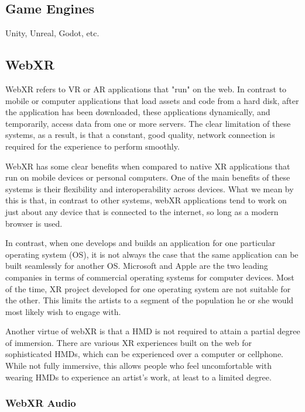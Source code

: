 

\subsection{Game Engines}
Unity, Unreal, Godot, etc.

\subsection{WebXR}

WebXR refers to VR or AR applications that "run" on the web. In contrast to mobile or computer applications that load assets and code from a hard disk, after the application has been downloaded, these applications dynamically, and temporarily, access data from one or more servers. The clear limitation of these systems, as a result, is that a constant, good quality, network connection is required for the experience to perform smoothly. 

WebXR has some clear benefits when compared to native XR applications that run on mobile devices or personal computers. One of the main benefits of these systems is their flexibility and interoperability across devices. What we mean by this is that, in contrast to other systems, webXR applications tend to work on just about any device that is connected to the internet, so long as a modern browser is used. 

In contrast, when one develops and builds an application for one particular operating system (OS), it is not always the case that the same application can be built seamlessly for another OS. Microsoft and Apple are the two leading companies in terms of commercial operating systems for computer devices. Most of the time, XR project developed for one operating system are not suitable for the other. This limits the artists to a segment of the population he or she would most likely wish to engage with. 

Another virtue of webXR is that a HMD is not required to attain a partial degree of immersion. There are various XR experiences built on the web for sophisticated HMDs, which can be experienced over a computer or cellphone. While not fully immersive, this allows people who feel uncomfortable with wearing HMDs to experience an artist's work, at least to a limited degree. 

\subsubsection{WebXR Audio}


